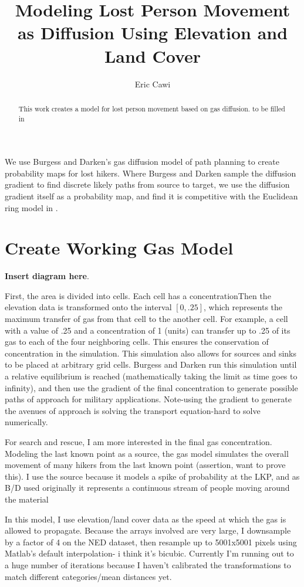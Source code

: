 \documentclass[]{article}
\title{Modeling Lost Person Movement as Diffusion Using Elevation and Land Cover}
\author{Eric Cawi}
\begin{document}
\maketitle

\begin{abstract}
This work creates a model for lost person movement based on gas diffusion. to be filled in
\end{abstract}
\tableofcontents

We use Burgess and Darken's  gas diffusion model of path planning to create probability maps for lost hikers. Where Burgess and Darken sample the diffusion gradient to find discrete likely paths from source to target, we use the diffusion gradient itself as a probability map, and find it is competitive with the Euclidean ring model in \cite{koester_lost_2008}.

\section{Create Working Gas Model}

\textbf{Insert diagram here}. 

First, the area is divided into cells. Each cell has a concentrationThen the elevation data is transformed onto the interval $[0,.25]$, which represents the maximum transfer of gas from that cell to the another cell. For example, a cell with a value of .25 and a concentration of 1 (units) can transfer up to .25 of its gas to each of the four neighboring cells. This ensures the conservation of concentration in the simulation. This simulation also allows for sources and sinks to be placed at arbitrary grid cells. Burgess and Darken run this simulation until a relative equilibrium is reached (mathematically taking the limit as time goes to infinity), and then use the gradient of the final concentration to generate possible paths of approach for military applications. Note-using the gradient to generate the avenues of approach is solving the transport equation-hard to solve numerically.

For search and rescue, I am more interested in the final gas concentration. Modeling the last known point as a source, the gas model simulates the overall movement of many hikers from the last known point (assertion, want to prove this). I use the source because it models a spike of probability at the LKP, and as B/D used originally it represents a continuous stream of people moving around the material

In this model, I use elevation/land cover data as the speed at which the gas is allowed to propagate. Because the arrays involved are very large, I downsample by a factor of 4 on the NED dataset, then resample up to 5001x5001 pixels using Matlab's default interpolation- i think it's bicubic. Currently I'm running out to a huge number of iterations because I haven't calibrated the transformations to match different categories/mean distances yet.
\end{document}
